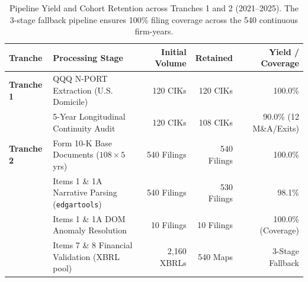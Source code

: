 \begin{table}[htbp]
\centering
\caption{Pipeline Yield and Cohort Retention across Tranches 1 and 2 (2021--2025). The 3-stage fallback pipeline ensures 100\% filing coverage across the 540 continuous firm-years.}
\label{tab:pipeline_yield}
\small
\begin{tabular}{@{}llrrr@{}}
\toprule
\textbf{Tranche} & \textbf{Processing Stage} & \textbf{Initial Volume} & \textbf{Retained} & \textbf{Yield / Coverage} \\
\midrule
\textbf{Tranche 1} & QQQ N-PORT Extraction (U.S. Domicile) & 120 CIKs & 120 CIKs & 100.0\% \\
 & 5-Year Longitudinal Continuity Audit & 120 CIKs & 108 CIKs & 90.0\% (12 M\&A/Exits) \\
\midrule
\textbf{Tranche 2} & Form 10-K Base Documents ($108 \times 5$ yrs) & 540 Filings & 540 Filings & 100.0\% \\
 & Items 1 \& 1A Narrative Parsing (\texttt{edgartools}) & 540 Filings & 530 Filings & 98.1\% \\
 & Items 1 \& 1A DOM Anomaly Resolution & 10 Filings & 10 Filings & 100.0\% (Coverage) \\
 & Items 7 \& 8 Financial Validation (XBRL pool) & 2,160 XBRLs & 540 Maps & 3-Stage Fallback \\
\bottomrule
\end{tabular}
\end{table}